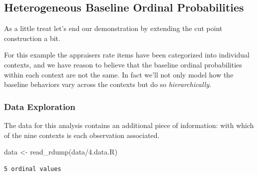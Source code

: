 \documentclass[
  letterpaper,
  DIV=11,
  numbers=noendperiod]{scrartcl}
\newenvironment{Shaded}{\begin{snugshade}}{\end{snugshade}}
\newcommand{\FunctionTok}[1]{\textcolor[rgb]{0.28,0.35,0.67}{#1}}
\newcommand{\NormalTok}[1]{\textcolor[rgb]{0.00,0.23,0.31}{#1}}
\newcommand{\OtherTok}[1]{\textcolor[rgb]{0.00,0.23,0.31}{#1}}
\newcommand{\SpecialCharTok}[1]{\textcolor[rgb]{0.37,0.37,0.37}{#1}}
\newcommand{\StringTok}[1]{\textcolor[rgb]{0.13,0.47,0.30}{#1}}
\begin{document}
\subsection{Heterogeneous Baseline Ordinal
Probabilities}\label{heterogeneous-baseline-ordinal-probabilities}

As a little treat let's end our demonstration by extending the cut point
construction a bit.

For this example the appraisers rate items have been categorized into
individual contexts, and we have reason to believe that the baseline
ordinal probabilities within each context are not the same. In fact
we'll not only model how the baseline behaviors vary across the contexts
but do so \emph{hierarchically}.

\subsubsection{Data Exploration}\label{data-exploration-3}

The data for this analysis contains an additional piece of information:
with which of the nine contexts is each observation associated.

\begin{Shaded}
\begin{Highlighting}[]
\NormalTok{data }\OtherTok{\textless{}{-}} \FunctionTok{read\_rdump}\NormalTok{(}\StringTok{\textquotesingle{}data/4.data.R\textquotesingle{}}\NormalTok{)}
\end{Highlighting}
\end{Shaded}

\begin{Shaded}
\end{Shaded}

\begin{verbatim}
5 ordinal values
\end{verbatim}

\begin{Shaded}
\end{Shaded}
\end{document}

